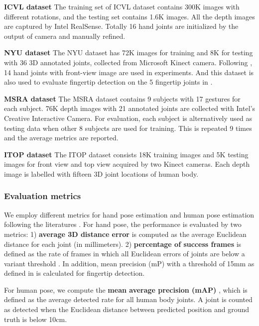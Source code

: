 \documentclass[10pt,twocolumn,letterpaper]{article}
\begin{document}
\noindent\textbf{ICVL dataset}\hspace{2mm} The training set of ICVL dataset contains 300K images with different rotations, and the testing set contains 1.6K images. All the depth images are captured by Intel RealSense. Totally 16 hand joints are initialized by the output of camera and manually refined.

\noindent\textbf{NYU dataset}\hspace{2mm} The NYU dataset has 72K images for training and 8K for testing with 36 3D annotated joints, collected from Microsoft Kinect camera. Following \cite{tompson2014real}, 14 hand joints with front-view image are used in experiments. And this dataset is also used to evaluate fingertip detection on the 5 fingertip joints in \cite{wetzler2015rule} \cite{guo2016two}.

\noindent\textbf{MSRA dataset}\hspace{2mm} The MSRA dataset contains 9 subjects with 17 gestures for each subject. 76K depth images with 21 annotated joints are collected with Intel's Creative Interactive Camera. For evaluation, each subject is alternatively used as testing data when other 8 subjects are used for training. This is repeated 9 times and the average metrics are reported.

\noindent\textbf{ITOP dataset}\hspace{2mm} The ITOP dataset consists 18K training images and 5K testing images for front view and top view acquired by two Kinect cameras. Each depth image is labelled with fifteen 3D joint locations of human body.

\subsubsection{Evaluation metrics}
We employ different metrics for hand pose estimation and human pose estimation following the literatures \cite{tang2014latent} \cite{tompson2014real} \cite{haque2016towards}. For hand pose, the performance is evaluated by two metrics: 1) \textbf{average 3D distance error} is computed as the average Euclidean distance for each joint (in millimeters). 2) \textbf{percentage of success frames} is defined as the rate of frames in which all Euclidean errors of joints are below a variant threshold \cite{oberweger2015hands}. In addition, mean precision (mP) with a threshold of 15mm as defined in \cite{wetzler2015rule} is calculated for fingertip detection.

For human pose, we compute the \textbf{mean average precision (mAP)} \cite{haque2016towards}, which is defined as the average detected rate for all human body joints. A joint is counted as detected when the Euclidean distance between predicted position and ground truth is below 10cm.
\end{document}
